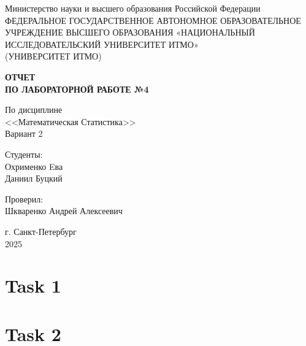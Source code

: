 \documentclass[14pt]{extreport}
\begin{document}
	
	\begin{titlepage}
		\centering
		\vspace*{1cm}
		
		{\large Министерство науки и высшего образования Российской Федерации}\\
		{\large ФЕДЕРАЛЬНОЕ ГОСУДАРСТВЕННОЕ АВТОНОМНОЕ ОБРАЗОВАТЕЛЬНОЕ УЧРЕЖДЕНИЕ ВЫСШЕГО ОБРАЗОВАНИЯ «НАЦИОНАЛЬНЫЙ ИССЛЕДОВАТЕЛЬСКИЙ УНИВЕРСИТЕТ ИТМО»}\\
		{\large (УНИВЕРСИТЕТ ИТМО)}\\
		
		\vspace{1cm}
		
		\textbf{{\Huge ОТЧЕТ}\\
			{\Huge ПО ЛАБОРАТОРНОЙ РАБОТЕ №4}}\\
		
		\vspace{1cm}
		
		{\LARGE По дисциплине\\
			<<Математическая Статистика>>}\\
		Вариант 2
		
		\vspace{2cm}
		
		{\Large Студенты:}\\
		Охрименко Eва\\
		Даниил Буцкий
		
		\vspace{2cm}
		
		{\Large Проверил:}\\
		Шкваренко Андрей Алексеевич\\
		
		\vspace{2cm}
		
		{\large г. Санкт-Петербург}\\
		{\large 2025}
	\end{titlepage}
	
	\tableofcontents
	\newpage
	
	\setcounter{section}{0} %
	
	\section{Task 1}
	
	\section{Task 2}
	
\end{document}
